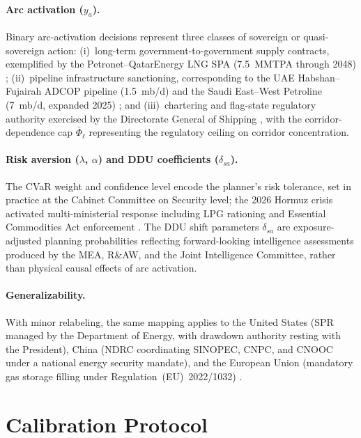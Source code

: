 \documentclass[final,3p,authoryear]{elsarticle}
\theoremstyle{definition}
\begin{document}
\paragraph{Arc activation ($y_a$).}
Binary arc-activation decisions represent three classes of sovereign or
quasi-sovereign action: (i)~long-term government-to-government supply
contracts, exemplified by the Petronet--QatarEnergy LNG SPA (7.5~MMTPA
through 2048) \citep{petronet2024qatar}; (ii)~pipeline infrastructure
sanctioning, corresponding to the UAE Habshan--Fujairah ADCOP pipeline
(1.5~mb/d) and the Saudi East--West Petroline (7~mb/d, expanded 2025)
\citep{iea2026hormuz, cnbc2026pipelines}; and (iii)~chartering and
flag-state regulatory authority exercised by the Directorate General of
Shipping \citep{indiastrategic2026hormuz}, with the corridor-dependence
cap $\bar\Phi_\ell$ representing the regulatory ceiling on corridor
concentration.

\paragraph{Risk aversion ($\lambda$, $\alpha$) and DDU coefficients ($\delta_{sa}$).}
The CVaR weight and confidence level encode the planner's risk
tolerance, set in practice at the Cabinet Committee on Security level;
the 2026 Hormuz crisis activated multi-ministerial response including
LPG rationing and Essential Commodities Act enforcement
\citep{tribune2026hormuz}. The DDU shift parameters $\delta_{sa}$ are
exposure-adjusted planning probabilities reflecting forward-looking
intelligence assessments produced by the MEA, R\&AW, and the Joint
Intelligence Committee, rather than physical causal effects of arc
activation.

\paragraph{Generalizability.}
With minor relabeling, the same mapping applies to the United States
(SPR managed by the Department of Energy, with drawdown authority
resting with the President), China (NDRC coordinating SINOPEC, CNPC,
and CNOOC under a national energy security mandate), and the European
Union (mandatory gas storage filling under
Regulation~(EU)~2022/1032) \citep{eu2022gasstorage}.

\newpage
\section{Calibration Protocol}
\label{app:calibration}
\end{document}
